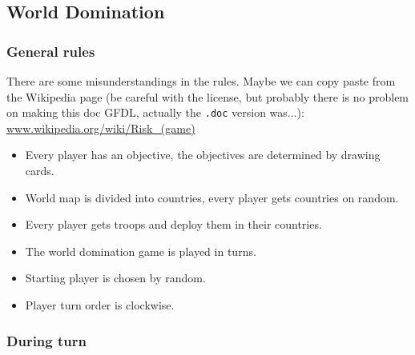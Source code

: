 \documentclass[12pt,a4paper]{article}
\begin{document}
\subsection{World Domination}

\subsubsection{General rules}

\begin{todo}
  There are some misunderstandings in the rules. Maybe we can copy paste
  from the Wikipedia page (be careful with the license, but probably
  there is no problem on making this doc GFDL, actually the
  \texttt{.doc} version was...):
  \url{www.wikipedia.org/wiki/Risk_(game)}
\end{todo}

\begin{itemize}
\item Every player has an objective, the objectives are determined by
  drawing cards.
\item World map is divided into countries, every player gets countries
  on random.
\item Every player gets troops and deploy them in their countries.
\item The world domination game is played in turns.
\item Starting player is chosen by random.
\item Player turn order is clockwise.
\end{itemize}

\subsubsection{During turn}
\end{document}

